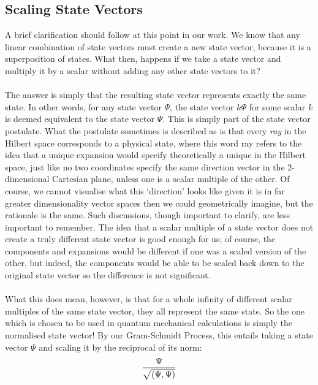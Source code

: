 \subsection{Scaling State Vectors}
A brief clarification should follow at this point in our work. We know that any linear combination of state vectors must create a new state vector, because it is a superposition of states. What then, happens if we take a state vector and multiply it by a scalar without adding any other state vectors to it? 
\\\\
The answer is simply that the resulting state vector represents exactly the same state. In other words, for any state vector $\Psi$, the state vector $k\Psi$ for some scalar $k$ is deemed equivalent to the state vector $\Psi$. This is simply part of the state vector postulate. What the postulate sometimes is described as is that every \textit{ray} in the Hilbert space corresponds to a physical state, where this word ray refers to the idea that a unique expansion would specify theoretically a unique  in the Hilbert space, just like no two coordinates specify the same direction vector in the 2-dimensional Cartesian plane, unless one is a scalar multiple of the other. Of course, we cannot visualise what this `direction' looks like given it is in far greater dimensionality vector spaces then we could geometrically imagine, but the rationale is the same. Such discussions, though important to clarify, are less important to remember. The idea that a scalar multiple of a state vector does not create a truly different state vector is good enough for us; of course, the components and expansions would be different if one was a scaled version of the other, but indeed, the components would be able to be scaled back down to the original state vector so the difference is not significant.
\\\\
What this does mean, however, is that for a whole infinity of different scalar multiples of the same state vector, they all represent the same state. So the one which is chosen to be used in quantum mechanical calculations is simply the normalised state vector! By our Gram-Schmidt Process, this entails taking a state vector $\Psi$ and scaling it by the reciprocal of its norm:
$$
\frac{\Psi}{\sqrt{\left(\Psi,\Psi\right)}}
$$
